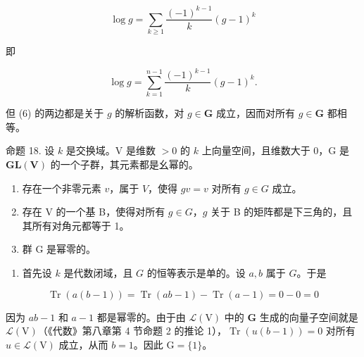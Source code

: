 \[
\log g = \sum_ {k \geqslant 1} \frac {(- 1) ^ {k - 1}}{k} (g - 1) ^ {k}
\]

即

\[
\log g = \sum_ {k = 1} ^ {n - 1} \frac {(- 1) ^ {k - 1}}{k} (g - 1) ^ {k}.\tag{6}
\]

但 (6) 的两边都是关于 \(g\) 的解析函数，对 \(g \in \mathbf{G}\) 成立，因而对所有 \(g \in \mathbf{G}\) 都相等。

命题 18. 设 \(k\) 是交换域。V 是维数 \(>0\) 的 \(k\) 上向量空间，且维数大于 0，G 是 \(\mathbf{GL}(\mathbf{V})\) 的一个子群，其元素都是幺幂的。

\begin{enumerate}
\def\labelenumi{(\roman{enumi})}
\item
  存在一个非零元素 \(v\)，属于 \(V\)，使得 \(gv = v\) 对所有 \(g \in G\) 成立。
\item
  存在 V 的一个基 B，使得对所有 \(g \in G\)，\(g\) 关于 B 的矩阵都是下三角的，且其所有对角元都等于 1。
\item
  群 G 是幂零的。
\end{enumerate}

\begin{enumerate}
\def\labelenumi{(\alph{enumi})}
\tightlist
\item
  首先设 \(k\) 是代数闭域，且 \(G\) 的恒等表示是单的。设 \(a, b\) 属于 \(G\)。于是
\end{enumerate}

\[
\operatorname{Tr} (a (b - 1)) = \operatorname{Tr} (a b - 1) - \operatorname{Tr} (a - 1) = 0 - 0 = 0
\]

因为 \(ab - 1\) 和 \(a - 1\) 都是幂零的。由于由 \(\mathcal{L}(\mathrm{V})\) 中的 \(\mathbf{G}\) 生成的向量子空间就是 \(\mathcal{L}(\mathrm{V})\)（《代数》第八章第 4 节命题 2 的推论 1），\(\operatorname{Tr}(u(b - 1)) = 0\) 对所有 \(u \in \mathcal{L}(\mathrm{V})\) 成立，从而 \(b = 1\)。因此 \(\mathrm{G} = \{1\}\)。

